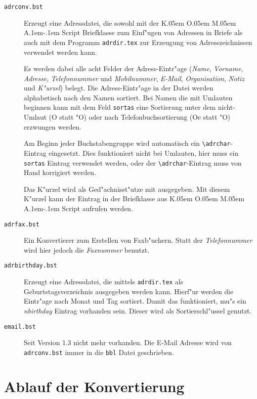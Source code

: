 \documentclass{article}
\newcommand*{\File}[1]{\texttt{#1}}
\newcommand*{\Macro}[1]{\texttt{\textbackslash #1}}
\DeclareRobustCommand{\KOMAScript}{\textsf{K\kern.05em O\kern.05em%
      M\kern.05em A\kern.1em-\kern.1em Script}}
\begin{document}
\begin{description}

	\item[\File{adrconv.bst}] Erzeugt eine Adressdatei, die sowohl mit
		der {\KOMAScript} Briefklasse zum Einf"ugen von Adressen in
		Briefe als auch mit dem Programm \File{adrdir.tex} zur
		Erzeugung von Adresszeichnissen verwendet werden kann.
	
	Es werden dabei	alle acht Felder der Adress-Eintr"age (\emph{Name},
	\emph{Vorname}, \emph{Adresse}, \emph{Telefonnummer} und
	\emph{Mobilnummer}, \emph{E-Mail}, \emph{Organisation}, \emph{Notiz}
	und \emph{K"urzel}) belegt. Die Adress-Eintr"age in der Datei werden
	alphabetisch nach den Namen sortiert. Bei Namen die mit Umlauten
	beginnen kann mit dem Feld \texttt{sortas} eine Sortierung unter dem
	nicht-Umlaut (O statt "O) oder nach Telefonbuchsortierung (Oe statt
	"O) erzwungen werden. 
	
	Am Beginn jeder Buchstabengruppe wird automatisch ein
	\Macro{adrchar}-Eintrag eingesetzt.  Dies funktioniert nicht bei
	Umlauten, hier muss ein \texttt{sortas} Eintrag verwendet werden,
	oder der \Macro{adrchar}-Eintrag muss von Hand korrigiert werden.
	
	Das K"urzel wird als Ged"achnisst"utze mit ausgegeben. Mit diesem
	K"urzel kann der Eintrag in der Briefklasse aus {\KOMAScript}
	aufrufen werden.
	
     \item[\File{adrfax.bst}]  Ein Konvertierer zum Erstellen von
     Faxb"uchern. Statt der \emph{Telefonnummer} wird hier jedoch
     die \emph{Faxnummer} benutzt. 
     
     \item[\File{adrbirthday.bst}] Erzeugt eine Adressdatei, die mittels
     \File{adrdir.tex} als Geburtstagsverzeichnis ausgegeben werden
     kann.  Hierf"ur werden die Eintr"age nach Monat und Tag
     sortiert. Damit das funktioniert, mu"s ein \emph{nbirthday}
     Eintrag vorhanden sein. Dieser wird als Sortierschl"ussel
     genutzt.

     \item[\File{email.bst}] Seit Version 1.3 nicht mehr vorhanden. Die
       E-Mail Adresse wird von \File{adrconv.bst} immer in die \texttt{bbl}
       Datei geschrieben.
     
     
\end{description}

\section{Ablauf der Konvertierung}
\end{document}

